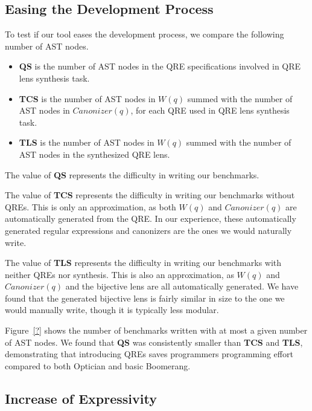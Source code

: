 \documentclass{svproc}
\newcommand{\canonizer}{\ensuremath{\mathit{Canonizer}}}
\newcommand{\QRESize}{\textbf{QS}}
\newcommand{\CanonizerAndSpecSize}{\textbf{TCS}}
\newcommand{\LensAndSpecSize}{\textbf{TLS}}
\begin{document}
\subsection{Easing the Development Process}

To test if our tool eases the development process, we compare the following
number of AST nodes.
%
\begin{itemize}
\item[\QRESize{}] \QRESize{} is the number of AST nodes in the QRE
  specifications involved in QRE lens synthesis task.
\item[\CanonizerAndSpecSize{}] \CanonizerAndSpecSize{} is the number of
  AST nodes in $W(q)$ summed with the number of AST nodes in $\canonizer(q)$,
  for each QRE used in QRE lens synthesis task.
\item[\LensAndSpecSize{}] \LensAndSpecSize{} is the number of AST nodes
  in $W(q)$ summed with the number of AST nodes in the synthesized QRE lens.
\end{itemize}

The value of \QRESize{} represents the difficulty in writing our benchmarks.

The value of \CanonizerAndSpecSize{} represents the difficulty in writing our
benchmarks without QREs.  This is only an approximation, as both $W(q)$ and
$\canonizer(q)$ are automatically generated from the QRE.  In our
experience, these automatically generated regular expressions and canonizers are
the ones we would naturally write.

The value of \LensAndSpecSize{} represents the difficulty in writing our benchmarks
with neither QREs nor synthesis.  This is also an approximation, as $W(q)$ and
$\canonizer(q)$ and the bijective lens are all automatically generated.
We have found that the generated bijective lens is fairly similar in size to the
one we would manually write, though it is typically less modular.

Figure~\ref{?} shows the number of benchmarks written with at most a given
number of AST nodes.  We found that \QRESize{} was consistently smaller than
\CanonizerAndSpecSize{} and \LensAndSpecSize{}, demonstrating that introducing
QREs saves programmers programming effort compared to both Optician and basic
Boomerang.

\subsection{Increase of Expressivity}
\end{document}
